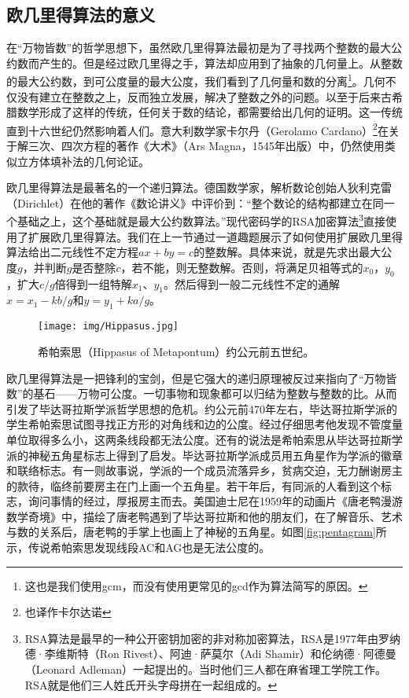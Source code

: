 \documentclass[b5paper]{ctexart}
\begin{document}
\subsection{欧几里得算法的意义}

在“万物皆数”的哲学思想下，虽然欧几里得算法最初是为了寻找两个整数的最大公约数而产生的。但是经过欧几里得之手，算法却应用到了抽象的几何量上。从整数的最大公约数，到可公度量的最大公度，我们看到了几何量和数的分离\footnote{这也是我们使用gcm，而没有使用更常见的gcd作为算法简写的原因。}。几何不仅没有建立在整数之上，反而独立发展，解决了整数之外的问题。以至于后来古希腊数学形成了这样的传统，任何关于数的结论，都需要给出几何的证明。这一传统直到十六世纪仍然影响着人们。意大利数学家卡尔丹（Gerolamo Cardano）\footnote{也译作卡尔达诺}在关于解三次、四次方程的著作《大术》（Ars Magna，1545年出版）中，仍然使用类似立方体填补法的几何论证\cite{HanXueTao2009}。

欧几里得算法是最著名的一个递归算法。德国数学家，解析数论创始人狄利克雷（Dirichlet）在他的著作《数论讲义》中评价到：“整个数论的结构都建立在同一个基础之上，这个基础就是最大公约数算法。”现代密码学的RSA加密算法\footnote{RSA算法是最早的一种公开密钥加密的非对称加密算法，RSA是1977年由罗纳德·李维斯特（Ron Rivest）、阿迪·萨莫尔（Adi Shamir）和伦纳德·阿德曼（Leonard Adleman）一起提出的。当时他们三人都在麻省理工学院工作。RSA就是他们三人姓氏开头字母拼在一起组成的。}直接使用了扩展欧几里得算法。我们在上一节通过一道趣题展示了如何使用扩展欧几里得算法给出二元线性不定方程$ax + by = c$的整数解。具体来说，就是先求出最大公度$g$，并判断$g$是否整除$c$，若不能，则无整数解。否则，将满足贝祖等式的$x_0$，$y_0$，扩大$c/g$倍得到一组特解$x_1$、$y_1$。然后得到一般二元线性不定的通解$x = x_1 - k b / g$和$y = y_1 + k a / g$。

\begin{figure}[htbp]
 \centering
 \texttt{[image: img/Hippasus.jpg]}
 \caption{希帕索思（Hippasus of Metapontum）约公元前五世纪。}
 \label{fig:Hippasus}
\end{figure}

欧几里得算法是一把锋利的宝剑，但是它强大的递归原理被反过来指向了“万物皆数”的基石——万物可公度。一切事物和现象都可以归结为整数与整数的比。从而引发了毕达哥拉斯学派哲学思想的危机。约公元前470年左右，毕达哥拉斯学派的学生希帕索思试图寻找正方形的对角线和边的公度。经过仔细思考他发现不管度量单位取得多么小，这两条线段都无法公度。还有的说法是希帕索思从毕达哥拉斯学派的神秘五角星标志上得到了启发。毕达哥拉斯学派成员用五角星作为学派的徽章和联络标志。有一则故事说，学派的一个成员流落异乡，贫病交迫，无力酬谢房主的款待，临终前要房主在门上画一个五角星。若干年后，有同派的人看到这个标志，询问事情的经过，厚报房主而去\cite{HanXueTao16}。美国迪士尼在1959年的动画片《唐老鸭漫游数学奇境》中，描绘了唐老鸭遇到了毕达哥拉斯和他的朋友们，在了解音乐、艺术与数的关系后，唐老鸭的手掌上也画上了神秘的五角星。如图\ref{fig:pentagram}所示，传说希帕索思发现线段AC和AG也是无法公度的。
\end{document}
